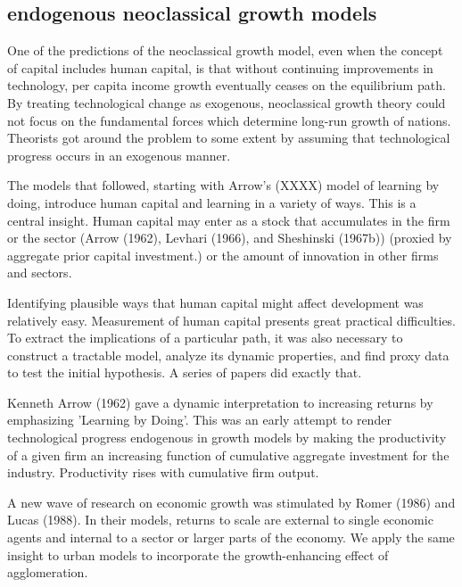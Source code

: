 {\subsection{endogenous neoclassical growth models}

One of the predictions of the neoclassical growth model, even  when the concept of capital includes human capital, is that without  continuing improvements in technology, per capita income growth eventually ceases on the equilibrium path. 
By treating technological change as exogenous, neoclassical growth theory could not focus on the fundamental forces which determine long-run growth of nations. Theorists got around the problem to some extent by assuming that technological progress occurs in an exogenous manner. 

The models that followed, starting with Arrow's  (XXXX) model of learning by doing, introduce human capital and learning in a variety of ways. This is a central insight. Human capital may enter  as a stock that accumulates in the firm or the sector (Arrow (1962), Levhari (1966), and Sheshinski (1967b)) (proxied by aggregate prior capital investment.)
or the amount of innovation in other firms and sectors. %


Identifying  plausible ways that human capital might affect development was relatively easy. Measurement of human capital presents great practical difficulties. To extract the implications of a particular path, it was also necessary to construct a tractable model, analyze its dynamic properties, and find proxy data to test the initial hypothesis.   A series of papers did exactly that.

Kenneth Arrow (1962) gave a dynamic interpretation to increasing returns by emphasizing 'Learning by Doing'. This was an early attempt to render technological progress endogenous in growth models by making the productivity of a given firm an increasing function of cumulative aggregate investment for the industry. Productivity rises with cumulative firm output.


A new wave of research on economic growth was stimulated by Romer (1986) and Lucas (1988). In their models, returns to scale are external to single economic agents and internal to a sector or larger parts of the economy. We apply the same insight to urban models to incorporate the growth-enhancing effect of agglomeration. 


}
